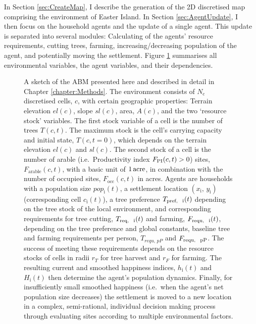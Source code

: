 In Section \ref{sec:CreateMap}, I describe the generation of the 2D discretised map comprising the environment of Easter Island. In Section \ref{sec:AgentUpdate}, I then focus on the household agents and the update of a single agent.
This update is separated into several modules: Calculating of the agents' resource requirements, cutting trees, farming, increasing/decreasing population of the agent, and potentially moving the settlement.
Figure \ref{fig:SketchABM} summarises all environmental variables, the agent variables, and their dependencies.


\begin{figure}[H]
	\centering
	\caption{
		A sketch of the ABM presented here and described in detail in Chapter \ref{chapter:Methods}.
		The environment consists of $N_\text{c}$ discretised cells, $c$, with certain geographic properties: Terrain elevation $el(c)$, slope $sl(c)$, area, $A(c)$, %
		and the two `resource stock' variables.
		The first stock variable of a cell is the number of trees $T(c,t)$.
		The maximum stock is the cell's carrying capacity and initial state, $T(c,t=0)$, which depends on the terrain elevation $el(c)$ and $sl(c)$. 
		The second stock of a cell is the number of arable (i.e.\ Productivity index $F_{\rm PI}(c,t)>0$) sites, $F_\text{arable}(c,t)$, with a basic unit of $1\, {\rm acre}$, in combination with the number of occupied sites, $F_\text{occ}(c,t)$ in acres.
		Agents are households with a population size $pop_\text{i}(t)$, a settlement location $(x_\text{i},\, y_\text{i})$ (corresponding cell $c_\text{i}(t)$), a tree preference $T_\text{pref, \, i}(t)$ depending on the tree stock of the local environment, and corresponding requirements for tree cutting, $T_\text{req, \, i}(t)$ and farming, $F_\text{requ, \, i}(t)$, depending on the tree preference and global constants, baseline tree and farming requirements per person, $T_{requ, \, pP}$ and  $F_\text{requ, \, pP}$.
		The success of meeting these requirements depends on the resource stocks of cells in radii $r_T$ for tree harvest and $r_F$ for farming. 
		The resulting current and smoothed happiness indices, $h_\text{i}(t)$ and $H_\text{i}(t)$ then determine the agent's population dynamics.
		Finally, for insufficiently small smoothed happiness (i.e.\ when the agent's net population size decreases) the settlement is moved to a new location in a complex, semi-rational, individual decision making process through evaluating sites according to multiple environmental factors.
	}
	\label{fig:SketchABM}
\end{figure}


